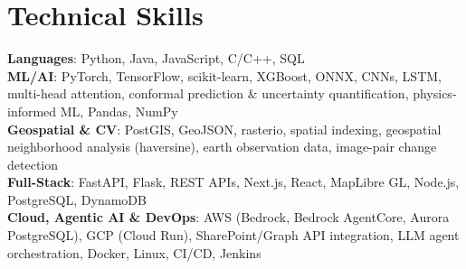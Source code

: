 \documentclass[letterpaper,11pt]{article}
\begin{document}
\section{Technical Skills}
 \begin{itemize}[leftmargin=0.15in, label={}]
    \small{\item{
    \textbf{Languages}{: Python, Java, JavaScript, C/C++, SQL} \\
    \textbf{ML/AI}{: PyTorch, TensorFlow, scikit-learn, XGBoost, ONNX, CNNs, LSTM, multi-head attention, conformal prediction \& uncertainty quantification, physics-informed ML, Pandas, NumPy} \\
    \textbf{Geospatial \& CV}{: PostGIS, GeoJSON, rasterio, spatial indexing, geospatial neighborhood analysis (haversine), earth observation data, image-pair change detection} \\
    \textbf{Full-Stack}{: FastAPI, Flask, REST APIs, Next.js, React, MapLibre GL, Node.js, PostgreSQL, DynamoDB} \\
    \textbf{Cloud, Agentic AI \& DevOps}{: AWS (Bedrock, Bedrock AgentCore, Aurora PostgreSQL), GCP (Cloud Run), SharePoint/Graph API integration, LLM agent orchestration, Docker, Linux, CI/CD, Jenkins}
    }}
 \end{itemize}
 \vspace{-16pt}
\end{document}
